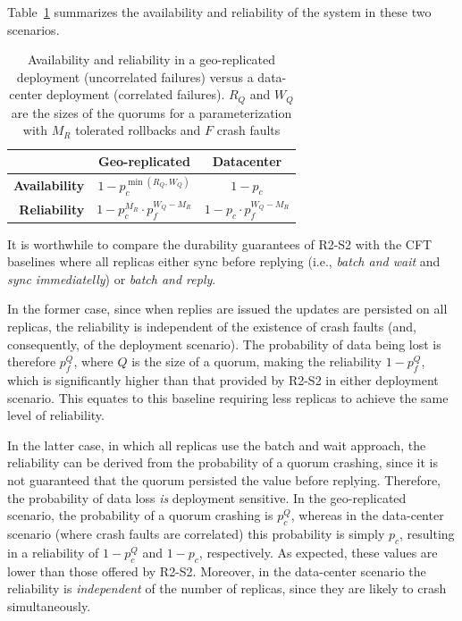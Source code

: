 Table~\ref{tab:parameterization} summarizes the availability and
reliability of the system in these two scenarios.

\begin{table}[ht]
    \centering
    \caption{Availability and reliability in a geo-replicated
    deployment (uncorrelated failures) versus a data-center
    deployment (correlated failures). $R_Q$ and $W_Q$
    are the sizes of the quorums for a parameterization with $M_R$
    tolerated rollbacks and $F$ crash faults}\label{tab:parameterization}
    \begin{tabular}{|r||c|c|}
        \hline
        & \textbf{Geo-replicated} & \textbf{Datacenter} \\ \hline
        \textbf{Availability} & $1 - p_c^{\min(R_Q, W_Q)}$ & $1 - p_c$ \\ \hline
        \textbf{Reliability}  & $1 - p_c^{M_R} \cdot p_f^{W_Q - M_R}$ & $1 - p_c \cdot p_f^{W_Q - M_R}$ \\ \hline
    \end{tabular}\label{tab:parameterization}
\end{table}

It is worthwhile to compare the durability guarantees of
\ac{R2-S2} with the \ac{CFT} baselines where all replicas either sync
before replying (i.e., \emph{batch and wait} and
\emph{sync immediatelly}) or \emph{batch and reply}.

In the former case, since when replies are issued the updates are
persisted on all replicas, the reliability is independent of the
existence of crash faults (and, consequently, of the deployment
scenario). The probability of data being lost is therefore
$p_f^{Q}$, where $Q$ is the size of a quorum, making the
reliability $1 - p_f^{Q}$, which is significantly higher than
that provided by \ac{R2-S2} in either deployment scenario. This equates to this baseline
requiring less replicas to achieve the same level of reliability.

In the latter case, in which all replicas use the batch and wait
approach, the reliability can be derived from the probability of
a quorum crashing, since it is not guaranteed that the quorum
persisted the value before replying. Therefore, the
probability of data loss \emph{is} deployment sensitive. In the
geo-replicated scenario, the probability of a quorum crashing is
$p_c^Q$, whereas in the data-center scenario (where crash faults
are correlated) this probability is simply $p_c$, resulting in
a reliability of $1 - p_c^Q$ and $1 - p_c$, respectively. As
expected, these values are lower than those offered by
\ac{R2-S2}. Moreover, in the data-center scenario the reliability
is \emph{independent} of the number of replicas, since they are
likely to crash simultaneously.




